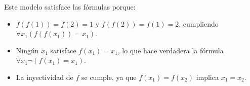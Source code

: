 \begin{solution}
Este modelo satisface las fórmulas porque:

\begin{itemize}
    \item \( f(f(1)) = f(2) = 1 \) y \( f(f(2)) = f(1) = 2 \), cumpliendo \( \forall x_1 (f(f(x_1)) = x_1) \).
    \item Ningún \( x_1 \) satisface \( f(x_1) = x_1 \), lo que hace verdadera la fórmula \( \forall x_1 \neg (f(x_1) = x_1) \).
    \item La inyectividad de \( f \) se cumple, ya que \( f(x_1) = f(x_2) \) implica \( x_1 = x_2 \).
\end{itemize}

\end{solution}